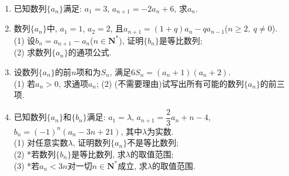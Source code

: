 \documentclass[10pt,a4paper]{article}
\begin{document}
\begin{enumerate}[1.]
\item 已知数列$\{a_n\}$满足: $a_1=3$, $a_{n+1}=-2a_n+6$, 求$a_n$.
\item 数列$\{a_n\}$中, $a_1=1$, $a_2=2$, 且$a_{n+1}=(1+q)a_n-qa_{n-1}$($n\ge 2, \ q\ne 0$).\\
(1) 设$b_n={a_{n+1}}-a_n$($n\in \mathbf{N}^*$), 证明$\{b_n\}$是等比数列;\\
(2) 求数列$\{a_n\}$的通项公式.
\item 设数列$\{a_n\}$的前$n$项和为$S_n$, 满足$6S_n=(a_n+1)(a_n+2)$.\\
(1) 若$a_n>0$, 求通项$a_n$;
(2) (不需要理由)试写出所有可能的数列$\{a_n\}$的前三项.
\item 已知数列$\{a_n\}$和$\{b_n\}$满足: $a_1=\lambda$, $a_{n+1}=\dfrac 23a_n+n-4$, $b_n=(-1)^n(a_n-3n+21)$, 其中$\lambda$为实数.\\
(1) 对任意实数$\lambda$, 证明数列$\{a_n\}$不是等比数列;\\
(2) *若数列$\{b_n\}$是等比数列, 求$\lambda$的取值范围;\\
(3) *若$a_n<3n$对一切$n\in \mathbf{N}^*$成立, 求$\lambda$的取值范围.




\end{enumerate}
\end{document}

